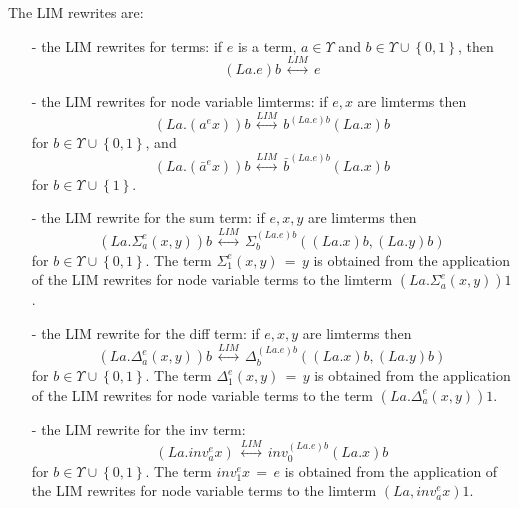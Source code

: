 \begin{definition}
The LIM rewrites are: 
\begin{enumerate}
\item[-] the LIM rewrites for  terms: if $e$ is a term, $a \in \Upsilon$ and $\displaystyle b \in \Upsilon \cup \left\{ 0 , 1 \right\}$, then $$(La.e)b \, \stackrel{LIM}{\longleftrightarrow} \, e$$  
\item[-] the LIM rewrites for node variable limterms: if $e, x$ are limterms then 
$$\displaystyle \left(La.\left(a^{e} x\right)\right) b  \, \stackrel{LIM}{\longleftrightarrow} \, b^{(La.e)b} (La.x)b$$ for $\displaystyle b \in \Upsilon \cup \left\{ 0 , 1 \right\}$, and  
$$\displaystyle \left(La.\left(\bar{a}^{e} x\right)\right) b  \, \stackrel{LIM}{\longleftrightarrow} \, \bar{b}^{(La.e)b} (La.x)b$$ for $\displaystyle b \in \Upsilon \cup \left\{  1 \right\}$. 
\item[-] the LIM rewrite for the sum term: if $e, x, y$ are limterms then 
$$\displaystyle \left( La.\Sigma_{a}^{e}(x,y) \right) b \, \stackrel{LIM}{\longleftrightarrow} \, \Sigma_{b}^{(La.e)b}((La.x)b,(La.y)b)$$ for $\displaystyle b \in \Upsilon \cup \left\{ 0 , 1 \right\}$. 
The term $\displaystyle \Sigma_{1}^{e} (x,y) \, = \, y$ is obtained from the application of the LIM rewrites for node variable terms to the limterm $\displaystyle (La.\Sigma_{a}^{e}(x,y)) 1$. 
\item[-] the LIM rewrite for the diff term: if $e, x, y$ are limterms then $$\displaystyle \left( La.\Delta_{a}^{e}(x,y)\right)b \, \stackrel{LIM}{\longleftrightarrow} \, \Delta_{b}^{(La.e)b}((La.x)b,(La.y)b)$$ for $\displaystyle b \in \Upsilon \cup \left\{ 0 , 1 \right\}$. 
The term $\displaystyle \Delta_{1}^{e} (x,y) \, = \, y$ is obtained from the application of the LIM rewrites for node variable terms to the term $\displaystyle (La.\Delta_{a}^{e}(x,y)) 1$. 
\item[-] the LIM rewrite for the inv term: $$\displaystyle \left(La.inv_{a}^{e} x\right) \, \stackrel{LIM}{\longleftrightarrow} \, inv_{0}^{(La.e)b} (La.x)b$$ for $\displaystyle b \in \Upsilon \cup \left\{ 0 , 1 \right\}$. The term $\displaystyle inv_{1}^{e} x  \, = \, e$ is obtained from the application of the LIM rewrites for node variable terms to the limterm $\displaystyle (La,inv_{a}^{e} x) 1$. 
\end{enumerate}

\end{definition}
